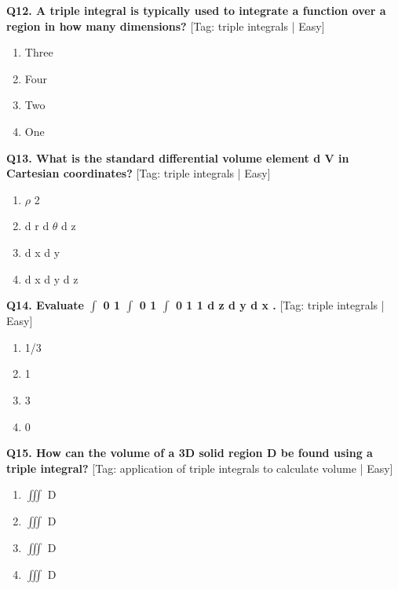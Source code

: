 \noindent\textbf{Q12. A triple integral is typically used to integrate a function over a region in how many dimensions?} \hfill [Tag: triple integrals | Easy]
\begin{enumerate}[label=(\alph*),topsep=2pt,itemsep=1pt,partopsep=0pt,parsep=0pt]
    \item {{Three}}
    \item {{Four}}
    \item {{Two}}
    \item {{One}}
\end{enumerate}
\vspace{2mm}

\noindent\textbf{Q13. What is the standard differential volume element d V in Cartesian coordinates?} \hfill [Tag: triple integrals | Easy]
\begin{enumerate}[label=(\alph*),topsep=2pt,itemsep=1pt,partopsep=0pt,parsep=0pt]
    \item {{$\rho$ 2}}
    \item {{d r d $\theta$ d z}}
    \item {{d x d y}}
    \item {{d x d y d z}}
\end{enumerate}
\vspace{2mm}

\noindent\textbf{Q14. Evaluate $\int$ 0 1 $\int$ 0 1 $\int$ 0 1 1 d z d y d x .} \hfill [Tag: triple integrals | Easy]
\begin{enumerate}[label=(\alph*),topsep=2pt,itemsep=1pt,partopsep=0pt,parsep=0pt]
    \item {{1/3}}
    \item {{1}}
    \item {{3}}
    \item {{0}}
\end{enumerate}
\vspace{2mm}

\noindent\textbf{Q15. How can the volume of a 3D solid region D be found using a triple integral?} \hfill [Tag: application of triple integrals to calculate volume | Easy]
\begin{enumerate}[label=(\alph*),topsep=2pt,itemsep=1pt,partopsep=0pt,parsep=0pt]
    \item {{$\iiint$ D}}
    \item {{$\iiint$ D}}
    \item {{$\iiint$ D}}
    \item {{$\iiint$ D}}
\end{enumerate}
\vspace{2mm}

